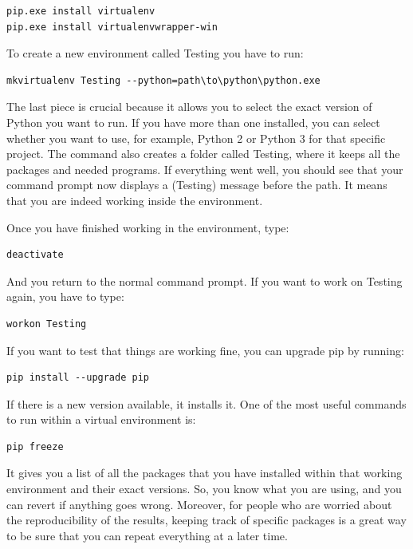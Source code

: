 \begin{verbatim}
pip.exe install virtualenv
pip.exe install virtualenvwrapper-win
\end{verbatim}

To create a new environment called Testing you have to run:

\begin{verbatim}
mkvirtualenv Testing --python=path\to\python\python.exe
\end{verbatim}

The last piece is crucial because it allows you to select the exact version of Python you want to run. If you have more than one installed, you can select whether you want to use, for example, Python 2 or Python 3 for that specific project. The command also creates a folder called Testing, where it keeps all the packages and needed programs. If everything went well, you should see that your command prompt now displays a (Testing) message before the path. It means that you are indeed working inside the environment.

Once you have finished working in the environment, type:

\begin{verbatim}
deactivate
\end{verbatim}

And you return to the normal command prompt. If you want to work on Testing again, you have to type:

\begin{verbatim}
workon Testing
\end{verbatim}

If you want to test that things are working fine, you can upgrade pip by running:

\begin{verbatim}
pip install --upgrade pip
\end{verbatim}

If there is a new version available, it installs it. One of the most useful commands to run within a virtual environment is:

\begin{verbatim}
pip freeze
\end{verbatim}

It gives you a list of all the packages that you have installed within that working environment and their exact versions. So, you know what you are using, and you can revert if anything goes wrong. Moreover, for people who are worried about the reproducibility of the results, keeping track of specific packages is a great way to be sure that you can repeat everything at a later time.

